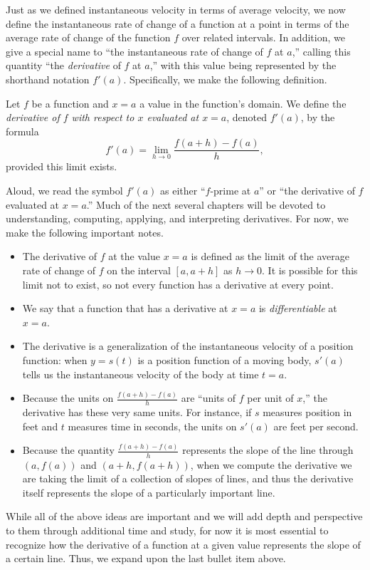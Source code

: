 Just as we defined instantaneous velocity in terms of average velocity, we now define the instantaneous rate of change of a function at a point in terms of the average rate of change of the function $f$ over related intervals.  In addition, we give a special name to ``the instantaneous rate of change of $f$ at $a$,'' calling this quantity ``the \emph{derivative} of $f$ at $a$,'' with this value being represented by the shorthand notation $f'(a)$.   Specifically, we make the following definition.
\begin{definition} \label{D:derivativedefna}
Let $f$ be a function and $x = a$ a value in the function's domain.  We define the \emph{derivative of $f$ with respect to $x$ evaluated at $x = a$}, denoted $f'(a)$, by the formula
$$f'(a) = \lim_{h \to 0} \frac{f(a+h)-f(a)}{h},$$
provided this limit exists.
\end{definition}
Aloud, we read the symbol $f'(a)$ as either ``$f$-prime at $a$'' or ``the derivative of $f$ evaluated at $x = a$.''  Much of the next several chapters will be devoted to understanding, computing, applying, and interpreting derivatives.  For now, we make the following important notes.
\begin{itemize}
	\item The derivative of $f$ at the value $x = a$ is defined as the limit of the average rate of change of $f$ on the interval $[a,a+h]$ as $h \to 0$.  It is possible for this limit not to exist, so not every function has a derivative at every point.
	\item We say that a function that has a derivative at $x = a$ is \emph{differentiable} at $x = a$.
	\item The derivative is a generalization of the instantaneous velocity of a position function:  when $y = s(t)$ is a position function of a moving body, $s'(a)$ tells us the instantaneous velocity of the body at time $t=a$.
	\item Because the units on $\frac{f(a+h)-f(a)}{h}$ are ``units of $f$ per unit of $x$,'' the derivative has these very same units.  For instance, if $s$ measures position in feet and $t$ measures time in seconds, the units on $s'(a)$ are feet per second. 
	\item Because the quantity $\frac{f(a+h)-f(a)}{h}$ represents the slope of the line through $(a,f(a))$ and $(a+h, f(a+h))$, when we compute the derivative we are taking the limit of a collection of slopes of lines, and thus the derivative itself represents the slope of a particularly important line.
\end{itemize}
While all of the above ideas are important and we will add depth and perspective to them through additional time and study, for now it is most essential to recognize how the derivative of a function at a given value represents the slope of a certain line.  Thus, we expand upon the last bullet item above.

